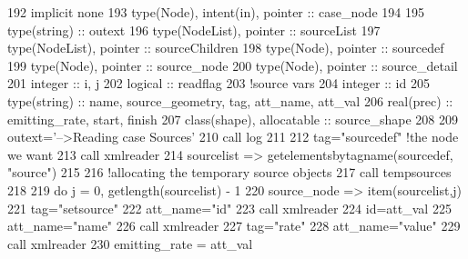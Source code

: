 \begin{DoxyCode}
192     \textcolor{keywordtype}{implicit none}
193     \textcolor{keywordtype}{type}(Node), \textcolor{keywordtype}{intent(in)}, \textcolor{keywordtype}{pointer} :: case\_node
194 
195     \textcolor{keywordtype}{type}(string) :: outext
196     \textcolor{keywordtype}{type}(NodeList), \textcolor{keywordtype}{pointer} :: sourceList
197     \textcolor{keywordtype}{type}(NodeList), \textcolor{keywordtype}{pointer} :: sourceChildren
198     \textcolor{keywordtype}{type}(Node), \textcolor{keywordtype}{pointer} :: sourcedef
199     \textcolor{keywordtype}{type}(Node), \textcolor{keywordtype}{pointer} :: source\_node
200     \textcolor{keywordtype}{type}(Node), \textcolor{keywordtype}{pointer} :: source\_detail
201     \textcolor{keywordtype}{integer} :: i, j
202     \textcolor{keywordtype}{logical} :: readflag
203     \textcolor{comment}{!source vars}
204     \textcolor{keywordtype}{integer} :: id
205     \textcolor{keywordtype}{type}(string) :: name, source\_geometry, tag, att\_name, att\_val
206     \textcolor{keywordtype}{real(prec)} :: emitting\_rate, start, finish
207     \textcolor{keywordtype}{class}(shape), \textcolor{keywordtype}{allocatable} :: source\_shape
208 
209     outext=\textcolor{stringliteral}{'-->Reading case Sources'}
210     \textcolor{keyword}{call }log%
211 
212     tag=\textcolor{stringliteral}{"sourcedef"}    \textcolor{comment}{!the node we want}
213     \textcolor{keyword}{call }xmlreader%
214     sourcelist => getelementsbytagname(sourcedef, \textcolor{stringliteral}{"source"})
215 
216     \textcolor{comment}{!allocating the temporary source objects}
217     \textcolor{keyword}{call }tempsources%
218 
219     \textcolor{keywordflow}{do} j = 0, getlength(sourcelist) - 1
220         source\_node => item(sourcelist,j)
221         tag=\textcolor{stringliteral}{"setsource"}
222         att\_name=\textcolor{stringliteral}{"id"}
223         \textcolor{keyword}{call }xmlreader%
224         id=att\_val%
225         att\_name=\textcolor{stringliteral}{"name"}
226         \textcolor{keyword}{call }xmlreader%
227         tag=\textcolor{stringliteral}{"rate"}
228         att\_name=\textcolor{stringliteral}{"value"}
229         \textcolor{keyword}{call }xmlreader%
230         emitting\_rate = att\_val%

\end{DoxyCode}
